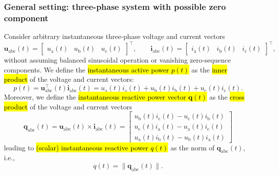 \begin{frame}
    \frametitle{General setting: three-phase system with possible zero component}
    Consider arbitrary instantaneous three-phase voltage and current vectors
    \begin{equation}
        \bm{u}_{\mathrm{abc}}(t)=\begin{bmatrix} u_{\mathrm{a}}(t) & u_{\mathrm{b}}(t) & u_{\mathrm{c}}(t) \end{bmatrix}^\top,
        \qquad
        \bm{i}_{\mathrm{abc}}(t)=\begin{bmatrix} i_{\mathrm{a}}(t) & i_{\mathrm{b}}(t) & i_{\mathrm{c}}(t) \end{bmatrix}^\top,
    \end{equation}
    without assuming balanced sinusoidal operation or vanishing zero-sequence components. \pause We define the \hl{instantaneous active power $p(t)$} as the \hl{inner product} of the voltage and current vectors:
    \begin{equation}
        p(t)=\bm{u}_{\mathrm{abc}}^{\top}(t)\bm{i}_{\mathrm{abc}}(t) = u_{\mathrm{a}}(t)i_{\mathrm{a}}(t) + u_{\mathrm{b}}(t)i_{\mathrm{b}}(t) + u_{\mathrm{c}}(t)i_{\mathrm{c}}(t).
    \end{equation}\pause
    Moreover, we define the \hl{instantaneous reactive power vector $\bm{q}(t)$} as the \hl{cross product} of the voltage and current vectors
    \begin{equation}
        \bm{q}_{\mathrm{abc}}(t)=\bm{u}_{\mathrm{abc}}(t)\times\bm{i}_{\mathrm{abc}}(t)=\begin{bmatrix}
            u_{\mathrm{b}}(t)i_{\mathrm{c}}(t)-u_{\mathrm{c}}(t)i_{\mathrm{b}}(t) \\
            u_{\mathrm{c}}(t)i_{\mathrm{a}}(t)-u_{\mathrm{a}}(t)i_{\mathrm{c}}(t) \\
            u_{\mathrm{a}}(t)i_{\mathrm{b}}(t)-u_{\mathrm{b}}(t)i_{\mathrm{a}}(t)
        \end{bmatrix}
    \end{equation}\pause
    leading to \hl{(scalar) instantaneous reactive power $q(t)$} as the norm of $\bm{q}_{\mathrm{abc}}(t)$, i.e.,
    \begin{equation}
        q(t)=\lVert\bm{q}_{\mathrm{abc}}(t)\rVert.
    \end{equation}
\end{frame}

